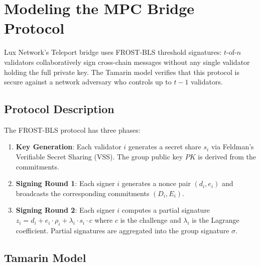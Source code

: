 \section{Modeling the MPC Bridge Protocol}


Lux Network's Teleport bridge uses FROST-BLS threshold signatures: $t$-of-$n$ validators
collaboratively sign cross-chain messages without any single validator holding the full
private key. The Tamarin model verifies that this protocol is secure against a network
adversary who controls up to $t - 1$ validators.

\subsection{Protocol Description}

The FROST-BLS protocol has three phases:
\begin{enumerate}
  \item \textbf{Key Generation}: Each validator $i$ generates a secret share $s_i$ via
    Feldman's Verifiable Secret Sharing (VSS). The group public key $PK$ is derived from
    the commitments.
  \item \textbf{Signing Round 1}: Each signer $i$ generates a nonce pair $(d_i, e_i)$
    and broadcasts the corresponding commitments $(D_i, E_i)$.
  \item \textbf{Signing Round 2}: Each signer $i$ computes a partial signature
    $z_i = d_i + e_i \cdot \rho_i + \lambda_i \cdot s_i \cdot c$ where $c$ is the
    challenge and $\lambda_i$ is the Lagrange coefficient. Partial signatures are
    aggregated into the group signature $\sigma$.
\end{enumerate}

\subsection{Tamarin Model}

